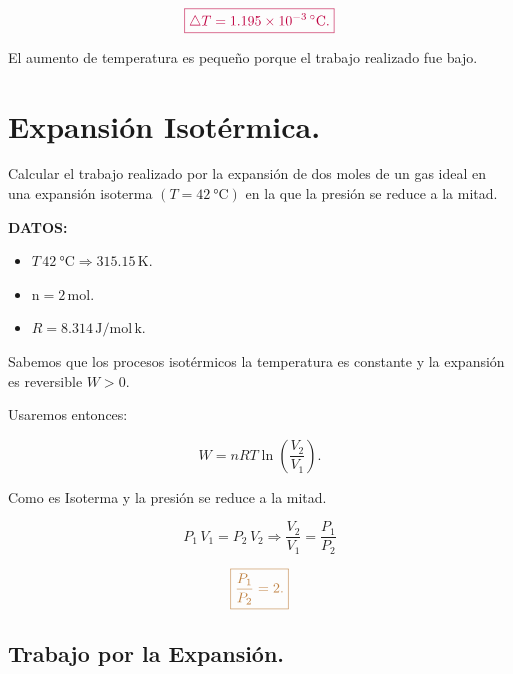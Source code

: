 \documentclass[a4paper,12pt]{article} %
\begin{document}
\[\textcolor{purple}{\boxed{ \triangle T = 1.195 \times 10^{-3} \, \SI{}{\degreeCelsius}. }}\]

\begin{justify}
	El aumento de temperatura es pequeño porque el trabajo realizado fue bajo.
\end{justify}

\section{Expansión Isotérmica.}

\begin{justify}
	Calcular el trabajo realizado por la expansión de dos moles de un gas ideal en una expansión isoterma \((T = \SI{42}{\degreeCelsius})\) en la que la presión se reduce a la mitad.
\end{justify}

\begin{justify}
	\textbf{DATOS:}
\end{justify}

\begin{itemize}
	\item \( T \, \SI{42}{\degreeCelsius} \Rightarrow 315.15 \, \mathrm{K}. \)
	\item \( \mathrm{n} = 2 \, \mathrm{mol}. \)
	\item \( R = 8.314 \, \mathrm{J}/ \mathrm{mol} \, \mathrm{k}. \)
\end{itemize}

\begin{justify}
	Sabemos que los procesos isotérmicos la temperatura es constante y la expansión es reversible \( W > 0\).
\end{justify}

\begin{justify}
	Usaremos entonces:
\end{justify}

\[ W = nRT \ln\left(\frac{V_2}{V_1}\right). \]

\begin{justify}
	Como es Isoterma y la presión se reduce a la mitad.
\end{justify}

\[ P_1 \, V_1 = P_2 \, V_2 \Rightarrow \frac{V_2}{V_1} = \frac{P_1}{P_2} \]

\[ \textcolor{brown}{\boxed{\frac{P_1}{P_2} = 2. }} \]

\subsection{Trabajo por la Expansión.}
\end{document}
